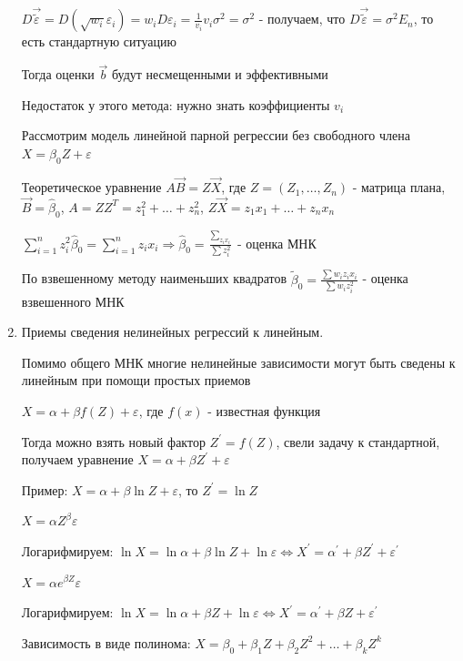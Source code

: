 \documentclass[12pt]{article}
\begin{document}
\begin{enumerate}
    $D \vec \tilde{\varepsilon} = D(\sqrt{w_i} \varepsilon_i) = w_i D \varepsilon_i = \frac{1}{v_i} v_i \sigma^2 = \sigma^2$ - получаем, что $D \vec \tilde{\varepsilon} = \sigma^2 E_n$, то есть стандартную ситуацию

    Тогда оценки $\vec b$ будут несмещенными и эффективными

    Недостаток у этого метода: нужно знать коэффициенты $v_i$

    \Ex Рассмотрим модель линейной парной регрессии без свободного члена $X = \beta_0 Z + \varepsilon$

    Теоретическое уравнение $A \vec B = Z \vec X$, где $Z = \left(Z_1, \dots, Z_n\right)$ - матрица плана, $\vec B = \hat \beta_0$, $A = Z Z^T = z_1^2 + \dots + z_n^2$, $Z \vec X = z_1 x_1 + \dots + z_n x_n$

    $\sum_{i = 1}^n z^2_i \hat \beta_0 = \sum_{i = 1}^n z_i x_i \Longrightarrow \hat \beta_0 = \frac{\sum_{z_i x_i}}{\sum z^2_i}$ - оценка МНК 

    По взвешенному методу наименьших квадратов $\tilde \beta_0 = \frac{\sum w_i z_i x_i}{\sum w_i z_i^2}$ - оценка взвешенного МНК

    \item Приемы сведения нелинейных регрессий к линейным.

    Помимо общего МНК многие нелинейные зависимости могут быть сведены к линейным при помощи простых приемов

     $X = \alpha + \beta f(Z) + \varepsilon$, где $f(x)$ - известная функция

    Тогда можно взять новый фактор $Z^\prime = f(Z)$, свели задачу к стандартной, получаем уравнение $X = \alpha + \beta Z^\prime + \varepsilon$

    Пример: $X = \alpha + \beta \ln Z + \varepsilon$, то $Z^\prime = \ln Z$

     $X = \alpha Z^\beta \varepsilon$

    Логарифмируем: $\ln X = \ln \alpha + \beta \ln Z + \ln \varepsilon \Longleftrightarrow X^\prime = \alpha^\prime + \beta Z^\prime + \varepsilon^\prime$

     $X = \alpha e^{\beta Z} \varepsilon$

    Логарифмируем: $\ln X = \ln \alpha + \beta Z + \ln \varepsilon \Longleftrightarrow X^\prime = \alpha^\prime + \beta Z + \varepsilon^\prime$

     Зависимость в виде полинома: $X = \beta_0 + \beta_1 Z + \beta_2 Z^2 + \dots + \beta_k Z^k$


\end{enumerate}
\end{document}
